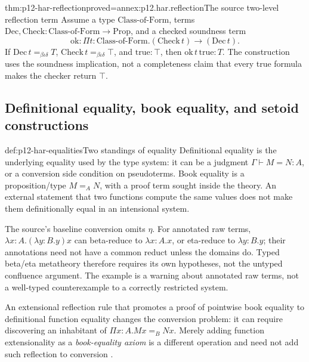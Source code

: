 \begin{hbtheorem}{thm:p12-har-reflection}{proved=annex:p12.har.reflection}{The source two-level reflection term}
Assume a type \(\mathrm{Class\!\mbox{-}\!of\!\mbox{-}\!Form}\),
terms \(\mathrm{Dec},\mathrm{Check}:
\mathrm{Class\!\mbox{-}\!of\!\mbox{-}\!Form}\to\mathrm{Prop}\),
and a checked soundness term
\[
 \mathrm{ok}:\Pi t:\mathrm{Class\!\mbox{-}\!of\!\mbox{-}\!Form}.
                    (\mathrm{Check}\,t)\to(\mathrm{Dec}\,t).
\]
If \(\mathrm{Dec}\,t=_{\beta\iota\delta}T\),
\(\mathrm{Check}\,t=_{\beta\iota\delta}\top\), and
\(\mathrm{true}:\top\), then
\(\mathrm{ok}\,t\,\mathrm{true}:T\).
The construction uses the soundness implication, not a completeness claim
that every true formula makes the checker return \(\top\).
\end{hbtheorem}

\subsection{Definitional equality, book equality, and setoid constructions}

\begin{hbdefinition}{def:p12-har-equalities}{Two standings of equality}
Definitional equality is the underlying equality used by the type system:
it can be a judgment \(\Gamma\vdash M=N:A\), or a conversion side
condition on pseudoterms. Book equality is a proposition/type
\(M=_A N\), with a proof term sought inside the theory. An external
statement that two functions compute the same values does not make them
definitionally equal in an intensional system.

The source's baseline conversion omits \(\eta\). For annotated raw
terms, \(\lambda x:A.(\lambda y:B.y)x\) can beta-reduce to
\(\lambda x:A.x\), or eta-reduce to \(\lambda y:B.y\); their
annotations need not have a common reduct unless the domains do. Typed
beta/eta metatheory therefore requires its own hypotheses, not the untyped
confluence argument. The example is a warning about annotated raw terms,
not a well-typed counterexample to a correctly restricted system.

An extensional reflection rule that promotes a proof of pointwise book
equality to definitional function equality changes the conversion problem:
it can require discovering an inhabitant of
\(\Pi x:A.Mx=_B Nx\). Merely adding function extensionality as a
\emph{book-equality axiom} is a different operation and need not add such
reflection to conversion \cite[pp.~1168--1172]{BarendregtGeuvers2001}.
\end{hbdefinition}

